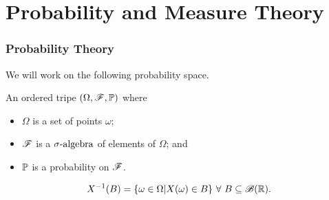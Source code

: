 \documentclass{beamer}
\begin{document}
\section{Probability and Measure Theory}
\begin{frame}
\frametitle{Probability Theory}

We will work on the following probability space.
\begin{definition}
An ordered tripe $(\Omega, \mathscr{F}, \mathbb{P})$ where
\begin{itemize}
	\item $\Omega$ is a set of points $\omega$;
	\item $\mathscr{F}$ is a $\sigma\text{-algebra}$ of elements of $\Omega$; and
	\item $\mathbb{P}$ is a probability on $\mathscr{F}$. 
\end{itemize}
\end{definition}

\begin{definition}
	\[
		X^{-1}(B) = \{\omega \in \Omega | X(\omega) \in B\} \ \forall \ B \subseteq \mathscr{B}(\mathbb{R}).
	\]
\end{definition}
\end{frame}
\end{document}
